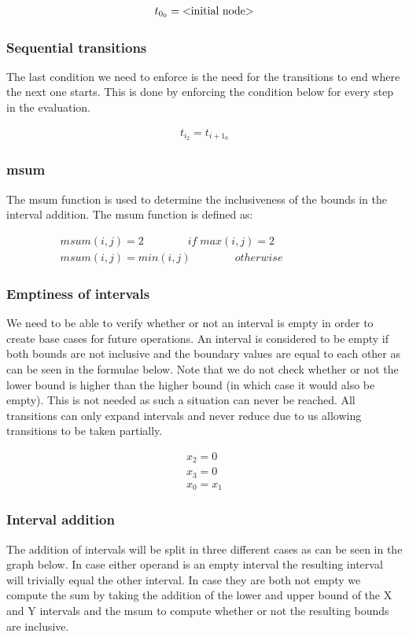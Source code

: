 \documentclass[12pt]{article}
\begin{document}
\begin{gather*}
	t_{0_0} = \text{\textless initial node\textgreater}
\end{gather*}

\subsubsection{Sequential transitions}
The last condition we need to enforce is the need for the transitions to end where the next one starts. This is done by enforcing the condition below for every step in the evaluation. 

\begin{gather*}
	t_{i_2} = t_{i+1_0}
\end{gather*}

\subsubsection{msum}
The msum function is used to determine the inclusiveness of the bounds in the interval addition. The msum function is defined as:

\begin{gather*}
msum(i, j) = 2 \qquad \qquad if \; max(i,j) = 2 \\
msum(i, j) = min(i, j) \quad \qquad \quad otherwise \qquad \qquad \qquad
\end{gather*}

\subsubsection{Emptiness of intervals}
We need to be able to verify whether or not an interval is empty in order to create base cases for future operations. An interval is considered to be empty if both bounds are not inclusive and the boundary values are equal to each other as can be seen in the formulae below. Note that we do not check whether or not the lower bound is higher than the higher bound (in which case it would also be empty). This is not needed as such a situation can never be reached. All transitions can only expand intervals and never reduce due to us allowing transitions to be taken partially.

\begin{gather*}
	x_2 = 0 \\
	x_3 = 0 \\
	x_0 = x_1
\end{gather*}

\subsubsection{Interval addition}
The addition of intervals will be split in three different cases as can be seen in the graph below. In case either operand is an empty interval the resulting interval will trivially equal the other interval. In case they are both not empty we compute the sum by taking the addition of the lower and upper bound of the X and Y intervals and the msum to compute whether or not the resulting bounds are inclusive.
\end{document}
